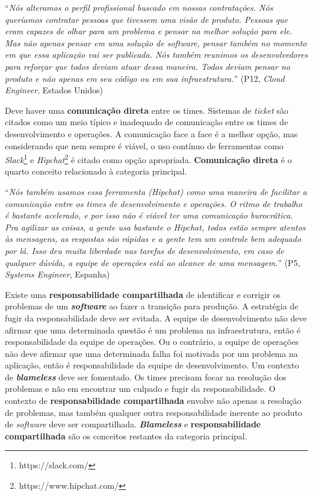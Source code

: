 \begin{mq}
``\emph{Nós alteramos o perfil profissional buscado em nossas contratações. Nós
queríamos contratar pessoas que tivessem uma visão de produto. Pessoas que eram
capazes de olhar para um problema e pensar na melhor solução para ele. Mas não
apenas pensar em uma solução de software, pensar também no momento em que essa
aplicação vai ser publicada. Nós também reunimos os desenvolvedores para
reforçar que todos deviam atuar dessa maneira. Todos deviam pensar no produto e
não apenas em seu código ou em sua infraestrutura.}'' (P12, {\it Cloud Engineer},
Estados Unidos)
\end{mq}

Deve haver uma {\bf comunicação direta} entre os times. Sistemas de {\it
ticket} são citados como um meio típico e inadequado de comunicação entre os
times de desenvolvimento e operações. A comunicação face a face é a melhor
opção, mas considerando que nem sempre é viável, o uso contínuo de ferramentas
como \emph{Slack}\footnote{https://slack.com/} e \emph{Hipchat}\footnote{https://www.hipchat.com/}
é citado como opção apropriada. {\bf Comunicação direta} é o quarto conceito
relacionado à categoria principal.

\begin{mq}
``\emph{Nós também usamos essa ferramenta ({\it Hipchat})
como uma maneira de facilitar a comunicação entre os times de desenvolvimento e
operações. O ritmo de trabalho é bastante acelerado, e por isso não é viável ter
uma comunicação burocrática. Pra agilizar as coisas, a gente usa bastante o
{\it Hipchat}, todos estão sempre atentos às mensagens, as respostas são
rápidas e a gente tem um controle bem adequado por lá. Isso deu muita liberdade
nas tarefas de desenvolvimento, em caso de qualquer dúvida, a equipe de
operações está ao alcance de uma mensagem.}'' (P5, {\it Systems Engineer}, Espanha)
\end{mq}

Existe uma {\bf responsabilidade compartilhada} de identificar e corrigir os
problemas de um {\bf \emph{software}} ao fazer a transição para produção. A estratégia
de fugir da responsabilidade deve ser evitada. A equipe de desenvolvimento não
deve afirmar que uma determinada questão é um problema na infraestrutura, então
é responsabilidade da equipe de operações. Ou o contrário, a equipe de operações
não deve afirmar que uma determinada falha foi motivada por um problema na
aplicação, então é responsabilidade da equipe de desenvolvimento. Um contexto de
{\bf \emph{blameless}} deve ser fomentado. Os times precisam focar na resolução dos
problemas e não em encontrar um culpado e fugir da responsabilidade. O contexto
de {\bf responsabilidade compartilhada} envolve não apenas a resolução de
problemas, mas também qualquer outra responsabilidade inerente ao produto de
{\it software} deve ser compartilhada. {\bf \emph{Blameless}} e {\bf responsabilidade
compartilhada} são os conceitos restantes da categoria principal.

